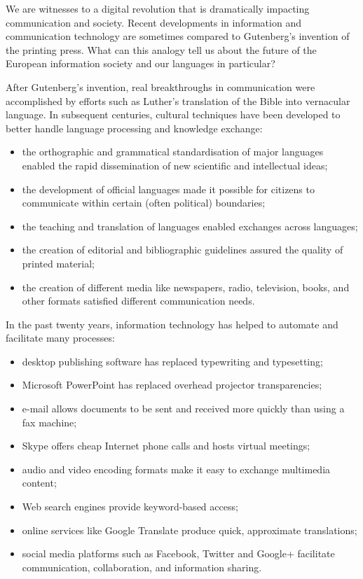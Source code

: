 \begin{multicols}{2}

We are witnesses to a digital revolution that is dramatically impacting communication and society. Recent developments in information and communication technology are sometimes compared to Gutenberg’s invention of the printing press. What can this analogy tell us about the future of the European information society and our languages in particular?


After Gutenberg’s invention, real breakthroughs in communication were accomplished by efforts such as Luther’s translation of the Bible into vernacular language. In subsequent centuries, cultural techniques have been developed to better handle language processing and knowledge exchange:

\begin{itemize}
\item the orthographic and grammatical standardisation of major languages enabled the rapid dissemination of new scientific and intellectual ideas;
\item the development of official languages made it possible for citizens to communicate within certain (often political) boundaries;
\item the teaching and translation of languages enabled exchanges across languages;
\item the creation of editorial and bibliographic guidelines assured the quality of printed material;
\item the creation of different media like newspapers, radio, television, books, and other formats satisfied different communication needs. 
\end{itemize}

In the past twenty years, information technology has helped to automate and facilitate many processes:

\begin{itemize}
\item desktop publishing software has replaced typewriting and typesetting;
\item Microsoft PowerPoint has replaced overhead projector transparencies;
\item e-mail allows documents to be sent and received more quickly than using a fax machine;
\item Skype offers cheap Internet phone calls and hosts virtual meetings;
\item audio and video encoding formats make it easy to exchange multimedia content;
\item Web search engines provide keyword-based access;
\item online services like Google Translate produce quick, approximate translations;
\item social media platforms such as Facebook, Twitter and Google+ facilitate communication, collaboration, and information sharing.
\end{itemize}


\end{multicols}
